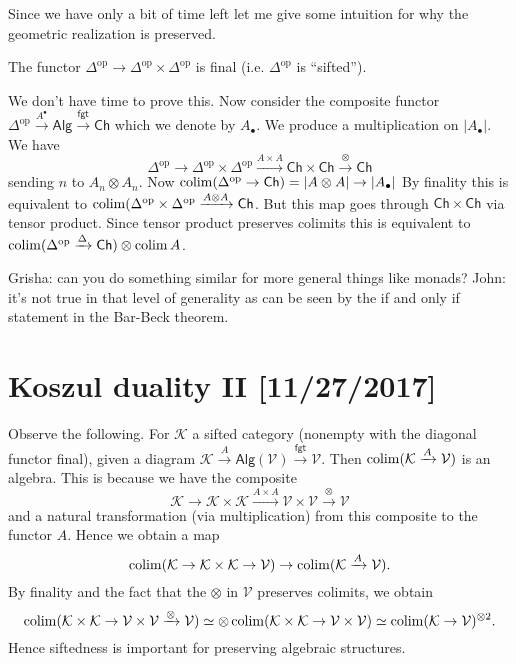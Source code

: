 \documentclass{amsart}
\begin{document}
Since we have only a bit of time left let me give some intuition for why the geometric
realization is preserved.
\begin{lemma}
    The functor $\Delta^\text{op}\to\Delta^\text{op}\times\Delta^\text{op}$ is final (i.e.
    $\Delta^\text{op}$ is ``sifted'').
\end{lemma}
We don't have time to prove this. Now consider the composite functor $\Delta^\text{op}\xrightarrow{A^\bullet}\mathsf{Alg}\xrightarrow{\mathsf{fgt}}\mathsf{Ch}$
which we denote by $A_\bullet$. We produce a multiplication on $|A_\bullet|$. We have
\begin{equation*}
    \Delta^\text{op}\to\Delta^{\text{op}}\times\Delta^\text{op}\xrightarrow{A\times A}\mathsf{Ch}\times\mathsf{Ch}\xrightarrow{\otimes}\mathsf{Ch}
\end{equation*}
sending $n$ to $A_n\otimes A_n$. Now $\operatorname*{colim}(\Delta^\text{op}\to\mathsf{Ch})=|A\otimes A|\to |A_\bullet|$
By finality this is equivalent to $\operatorname*{colim}(\Delta^\text{op}\times\Delta^\text{op}\xrightarrow{A\otimes A}\mathsf{Ch}$.
But this map goes through $\mathsf{Ch}\times\mathsf{Ch}$ via tensor product. Since tensor product preserves
colimits this is equivalent to $\operatorname*{colim}(\Delta^\text{op}\xrightarrow{\Delta}\mathsf{Ch})\otimes\operatorname*{colim} A$.

Grisha: can you do something similar for more general things like monads?
John: it's not true in that level of generality as can be seen by the if and only
if statement in the Bar-Beck theorem.

\newpage

\section{Koszul duality II [11/27/2017]}

Observe the following. For $\mathcal{K}$ a sifted category (nonempty with the diagonal functor final),
given a diagram $\mathcal{K}\xrightarrow{A}\mathsf{Alg}(\mathcal{V})\xrightarrow{\mathsf{fgt}}\mathcal{V}$.
Then $\operatorname*{colim}(\mathcal{K}\xrightarrow{A}\mathcal{V})$ is an algebra. This is because we have the composite
\begin{equation*}
    \mathcal{K}\to \mathcal{K}\times\mathcal{K}\xrightarrow{A\times A}\mathcal{V}\times\mathcal{V}\xrightarrow{\otimes}\mathcal{V}
\end{equation*}
and a natural transformation (via multiplication) from this composite to the functor $A$. Hence we obtain
a map
\begin{equation*}
    \operatorname*{colim}(\mathcal{K}\to\mathcal{K}\times\mathcal{K}\to \mathcal{V}) \to \operatorname*{colim}(\mathcal{K}\xrightarrow{A}\mathcal{V}).
\end{equation*}
By finality and the fact that the $\otimes$ in $\mathcal{V}$ preserves colimits, we obtain
\begin{equation*}
    \operatorname*{colim}(\mathcal{K}\times\mathcal{K}\to \mathcal{V}\times \mathcal{V}\xrightarrow{\otimes}\mathcal{V}) \simeq \otimes \operatorname*{colim}(\mathcal{K}\times\mathcal{K}\to \mathcal{V}\times\mathcal{V})\simeq \operatorname*{colim}(\mathcal{K}\to \mathcal{V})^{\otimes 2}.
\end{equation*}
Hence siftedness is important for preserving algebraic structures.
\end{document}
